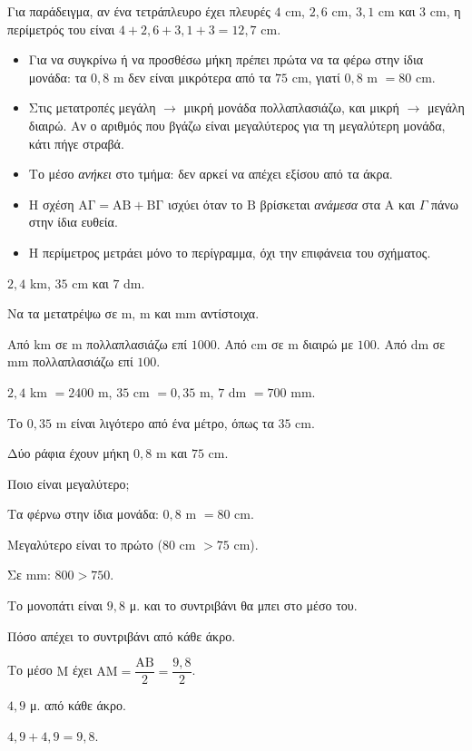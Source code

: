 Για παράδειγμα, αν ένα τετράπλευρο έχει πλευρές $4$ cm, $2{,}6$ cm, $3{,}1$ cm και $3$ cm, η περίμετρός του είναι $4+2{,}6+3{,}1+3=12{,}7$ cm.

\begin{prosoxi}
\begin{itemize}[leftmargin=1.2em,itemsep=0.3ex,topsep=2pt]
\item Για να συγκρίνω ή να προσθέσω μήκη πρέπει πρώτα να τα φέρω στην ίδια μονάδα: τα $0{,}8$ m δεν είναι μικρότερα από τα $75$ cm, γιατί $0{,}8$ m $=80$ cm.
\item Στις μετατροπές μεγάλη $\to$ μικρή μονάδα πολλαπλασιάζω, και μικρή $\to$ μεγάλη διαιρώ. Αν ο αριθμός που βγάζω είναι μεγαλύτερος για τη μεγαλύτερη μονάδα, κάτι πήγε στραβά.
\item Το μέσο \emph{ανήκει} στο τμήμα: δεν αρκεί να απέχει εξίσου από τα άκρα.
\item Η σχέση $\mathrm{ΑΓ}=\mathrm{ΑΒ}+\mathrm{ΒΓ}$ ισχύει όταν το $\mathrm{Β}$ βρίσκεται \emph{ανάμεσα} στα $\mathrm{Α}$ και $\Gamma$ πάνω στην ίδια ευθεία.
\item Η περίμετρος μετράει μόνο το περίγραμμα, όχι την επιφάνεια του σχήματος.
\end{itemize}
\end{prosoxi}


\tixero $2{,}4$ km, $35$ cm και $7$ dm.\par
\tithelo Να τα μετατρέψω σε m, m και mm αντίστοιχα.\par
\possindeo Από km σε m πολλαπλασιάζω επί $1000$. Από cm σε m διαιρώ με $100$. Από dm σε mm πολλαπλασιάζω επί $100$.\par
\apantisi $2{,}4$ km $=2400$ m, $35$ cm $=0{,}35$ m, $7$ dm $=700$ mm.\par
\elegxos Το $0{,}35$ m είναι λιγότερο από ένα μέτρο, όπως τα $35$ cm.

\tixero Δύο ράφια έχουν μήκη $0{,}8$ m και $75$ cm.\par
\tithelo Ποιο είναι μεγαλύτερο;\par
\possindeo Τα φέρνω στην ίδια μονάδα: $0{,}8$ m $=80$ cm.\par
\apantisi Μεγαλύτερο είναι το πρώτο ($80$ cm $>75$ cm).\par
\elegxos Σε mm: $800>750$.

\tixero Το μονοπάτι είναι $9{,}8$ μ. και το συντριβάνι θα μπει στο μέσο του.\par
\tithelo Πόσο απέχει το συντριβάνι από κάθε άκρο.\par
\possindeo Το μέσο $\mathrm{Μ}$ έχει $\mathrm{ΑΜ}=\dfrac{\mathrm{ΑΒ}}{2}=\dfrac{9{,}8}{2}$.\par
\apantisi $4{,}9$ μ. από κάθε άκρο.\par
\elegxos $4{,}9+4{,}9=9{,}8$.

